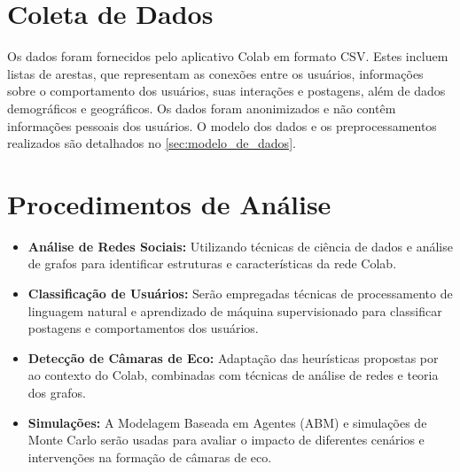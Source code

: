 \section{Coleta de Dados}
Os dados foram fornecidos pelo aplicativo Colab em formato CSV. Estes incluem listas de arestas, que representam as conexões entre os usuários, informações sobre o comportamento dos usuários, suas interações e postagens, além de dados demográficos e geográficos. Os dados foram anonimizados e não contêm informações pessoais dos usuários. O modelo dos dados e os preprocessamentos realizados são detalhados no \autoref{sec:modelo_de_dados}.

\section{Procedimentos de Análise}
\begin{itemize}
	\item \textbf{Análise de Redes Sociais:} Utilizando técnicas de ciência de dados e análise de grafos para identificar estruturas e características da rede Colab.
	\item \textbf{Classificação de Usuários:} Serão empregadas técnicas de processamento de linguagem natural e aprendizado de máquina supervisionado para classificar postagens e comportamentos dos usuários.
	\item \textbf{Detecção de Câmaras de Eco:} Adaptação das heurísticas propostas por \cite{2023_Atiqi_BOOK} ao contexto do Colab, combinadas com técnicas de análise de redes e teoria dos grafos.
	\item \textbf{Simulações:} A Modelagem Baseada em Agentes (ABM) e simulações de Monte Carlo serão usadas para avaliar o impacto de diferentes cenários e intervenções na formação de câmaras de eco.
\end{itemize}

